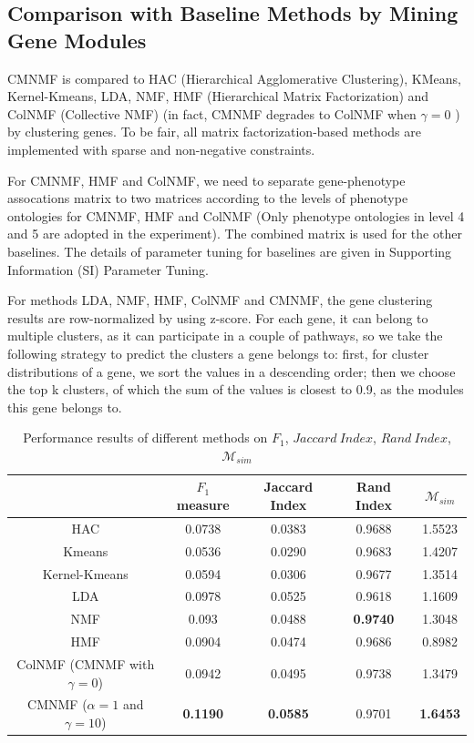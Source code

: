 \documentclass{bmcart}
\begin{document}
\subsection*{\textbf{Comparison with Baseline Methods by Mining Gene Modules}}

CMNMF is compared to HAC (Hierarchical Agglomerative Clustering)\cite{Ward1963}, KMeans, Kernel-Kmeans\cite{Dhillon2004}, LDA\cite{Blei2003}, NMF\cite{Mika1999}, HMF (Hierarchical Matrix Factorization) \cite{AliMashhoori2012} and ColNMF (Collective NMF)\cite{Singh2008} (in fact, CMNMF degrades to ColNMF when $\gamma=0$ ) by clustering genes. To be fair, all matrix factorization-based methods are implemented with sparse and non-negative constraints.

For CMNMF, HMF and ColNMF, we need to separate gene-phenotype assocations matrix to two matrices according to the levels of phenotype ontologies for CMNMF, HMF and ColNMF (Only phenotype ontologies in level 4 and 5 are adopted in the experiment). The combined matrix is used for the other baselines. The details of parameter tuning for baselines are given in {\color{red}Supporting Information (SI) Parameter Tuning}.

For methods LDA, NMF, HMF, ColNMF and CMNMF, the gene clustering results are row-normalized by using z-score. For each gene, it can belong to multiple clusters, as it can participate in a couple of pathways, so we take the following strategy to predict the clusters a gene belongs to: first, for cluster distributions of a gene, we sort the values in a descending order; then we choose the top k clusters, of which the sum of the values is closest to 0.9, as the modules this gene belongs to.

\begin{table}[!t]
\centering
\caption{Performance results of different methods on $F_1$, $Jaccard\ Index$, $Rand\ Index$, $\mathcal{M}_{sim}$}\label{tab:measurements}
\begin{tabular}{c|cccc}
\hline
&$F_1$ measure &Jaccard Index& Rand Index&$\mathcal{M}_{sim}$\\
\hline
HAC&0.0738&0.0383&0.9688&1.5523\\
Kmeans&0.0536&0.0290&0.9683&1.4207\\
Kernel-Kmeans&0.0594&0.0306&0.9677&1.3514\\
LDA&0.0978&0.0525&0.9618&1.1609\\
NMF&0.093&0.0488&\textbf{0.9740}&1.3048\\
HMF&0.0904&0.0474&0.9686&0.8982\\
ColNMF (CMNMF with $\gamma=0$)&0.0942&0.0495&0.9738&1.3479\\
CMNMF ($\alpha=1$ and $\gamma=10$)&\textbf{0.1190}& \textbf{0.0585}&{0.9701}& \textbf{1.6453}\\
\hline
\end{tabular}
\end{table}
\end{document}
